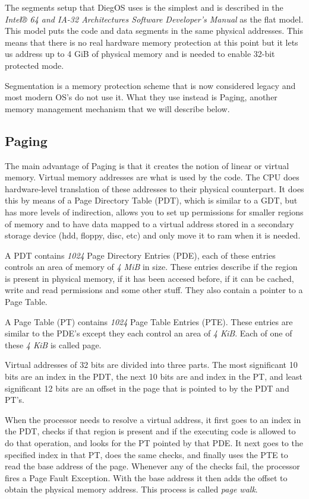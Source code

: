 \documentclass[12pt]{article}
\begin{document}
The segments setup that DiegOS uses is the simplest and is described in the \textit{Intel® 64 and IA-32 Architectures
Software Developer’s Manual} as the flat model. This model puts the code and data segments in the same physical addresses.
This means that there is no real hardware memory protection at this point but it lets us address up to 4 GiB of physical
memory and is needed to enable 32-bit protected mode.

Segmentation is a memory protection scheme that is now considered legacy and most modern OS's do not use it. What they use
instead is Paging, another memory management mechanism that we will describe below.

\subsection*{Paging}

The main advantage of Paging is that it creates the notion of linear or virtual memory. Virtual memory addresses are 
what is used by the code.
The CPU does hardware-level translation of these addresses to their physical counterpart.
It does this by means of a Page Directory Table (PDT), which is similar to a GDT, but has more levels of indirection, 
allows you to set up permissions
for smaller regions of memory and to have data mapped to a virtual address stored in a secondary storage device (hdd,
floppy, disc, etc) and only move it to ram when it is needed.

A PDT contains \textit{1024} Page Directory Entries (PDE), each of these entries controls an area of memory of 
\textit{4 MiB} in size. These entries describe if the region is present in physical memory, if it has been 
accesed before, if it can be cached, write and read permissions and some other stuff. 
They also contain a pointer to a Page Table.

A Page Table (PT) contains \textit{1024} Page Table Entries (PTE). These entries are similar to the PDE's except 
they each control an area of \textit{4 KiB}. Each of one of these \textit{4 KiB} is called page.

Virtual addresses of 32 bits are divided into three parts. The most significant 10 bits are an index in 
the PDT, the next 10 bits are and index in the PT, and least significant 12 bits are an offset in the 
page that is pointed to by the PDT and PT's. 

When the processor needs to resolve a virtual address,
it first goes to an index in the PDT, checks if that region is present and if the executing code is 
allowed to do that operation, and looks for the PT pointed by that PDE. It next goes to the specified
index in that PT, does the same checks, and finally uses the PTE to read the base address of the page.
Whenever any of the checks fail, the processor fires a Page Fault Exception.
With the base address it then adds the offset to obtain the physical memory address. This process is called
\textit{page walk}. \\
\end{document}
